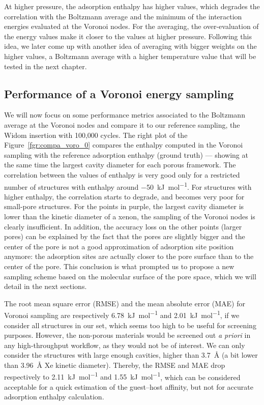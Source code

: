 \documentclass[main]{subfiles}
\begin{document}
At higher pressure, the adsorption enthalpy has higher values, which degrades the correlation with the Boltzmann average and the minimum of the interaction energies evaluated at the Voronoi nodes. For the averaging, the over-evaluation of the energy values make it closer to the values at higher pressure. Following this idea, we later come up with another idea of averaging with bigger weights on the higher values, a Boltzmann average with a higher temperature value that will be tested in the next chapter. 

\subsection{Performance of a Voronoi energy sampling}

We will now focus on some performance metrics associated to the Boltzmann average at the Voronoi nodes and compare it to our reference sampling, the Widom insertion with 100,000 cycles. The right plot of the Figure~\ref{fgr:compa_voro_0} compares the enthalpy computed in the Voronoi sampling with the reference adsorption enthalpy (ground truth) --- showing at the same time the largest cavity diameter for each porous framework. The correlation between the values of enthalpy is very good only for a restricted number of structures with enthalpy around \SI{-50}{\kilo\joule\per\mole}. For structures with higher enthalpy, the correlation starts to degrade, and becomes very poor for small-pore structures. For the points in purple, the largest cavity diameter is lower than the kinetic diameter of a xenon, the sampling of the Voronoi nodes is clearly insufficient. In addition, the accuracy loss on the other points (larger pores) can be explained by the fact that the pores are slightly bigger and the center of the pore is not a good approximation of adsorption site position anymore: the adsorption sites are actually closer to the pore surface than to the center of the pore. This conclusion is what prompted us to propose a new sampling scheme based on the molecular surface of the pore space, which we will detail in the next sections.

The root mean square error (RMSE) {and the mean absolute error (MAE) for Voronoi sampling are respectively \SI{6.78}{\kilo\joule\per\mole} and \SI{2.01}{\kilo\joule\per\mole}}, if we consider all structures in our set, which seems too high to be useful for screening purposes. However, the non-porous materials would be screened out \emph{a priori} in any high-throughput workflow, as they would not be of interest. We can only consider the structures with large enough cavities, higher than \SI{3.7}{\angstrom} (a bit lower than \SI{3.96}{\angstrom} Xe kinetic diameter). Thereby, {the RMSE and MAE drop respectively to \SI{2.11}{\kilo\joule\per\mole} and \SI{1.55}{\kilo\joule\per\mole}}, which can be considered acceptable for a quick estimation of the guest--host affinity, but not for accurate adsorption enthalpy calculation.
\end{document}
